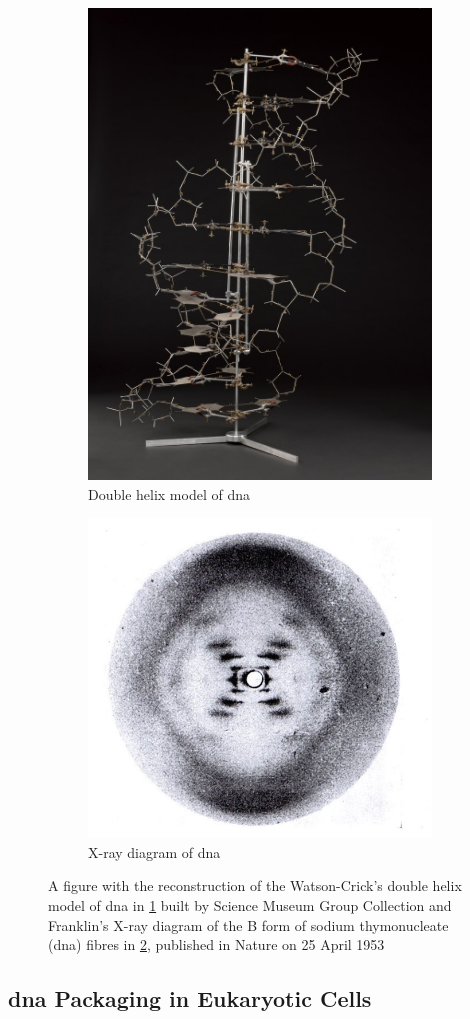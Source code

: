 \begin{figure}[H]
\centering
\begin{subfigure}{.5\textwidth}
    \centering
    \includegraphics[width=.4\linewidth]{figs/watson_crick.jpg}
    \caption{Double helix model of \ac{dna}}
    \label{fig:watcrick}
\end{subfigure}%
\begin{subfigure}{.5\textwidth}
    \centering
    \includegraphics[width=.6\linewidth]{figs/franklin.jpg}
    \caption{X-ray diagram of \ac{dna}}
    \label{fig:franklin}
\end{subfigure}
\caption{A figure with the reconstruction of the Watson-Crick's double helix model of \ac{dna} in \ref{fig:watcrick} built by Science Museum Group Collection \cite{watcrick} and Franklin's X-ray diagram of the B form of sodium thymonucleate (\ac{dna}) fibres in \ref{fig:franklin}, published in Nature on 25 April 1953 \cite{Maddox2003}}
\label{fig:test}
\end{figure}


\subsection{\ac{dna} Packaging in Eukaryotic Cells}

